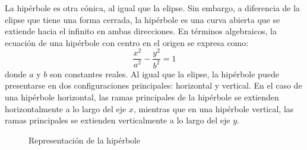 \begin{reminder}
    \noindent La hipérbole es otra cónica, al igual que la elipse. Sin embargo, a diferencia de la elipse que tiene una forma cerrada, la hipérbole es una curva abierta que se extiende hacia el infinito en ambas direcciones. En términos algebraicos, la ecuación de una hipérbole con centro en el origen se expresa como:
    $$\frac{x^2}{a^2} - \frac{y^2}{b^2} = 1$$
    donde $a$ y $b$ son constantes reales. Al igual que la elipse, la hipérbole puede presentarse en dos configuraciones principales: horizontal y vertical. En el caso de una hipérbole horizontal, las ramas principales de la hipérbole se extienden horizontalmente a lo largo del eje $x$, mientras que en una hipérbole vertical, las ramas principales se extienden verticalmente a lo largo del eje $y$.
    \begin{figure}[h!]
        \centering
         \hfill
        \caption{Representación de la hipérbole}
    \end{figure}
\end{reminder}

